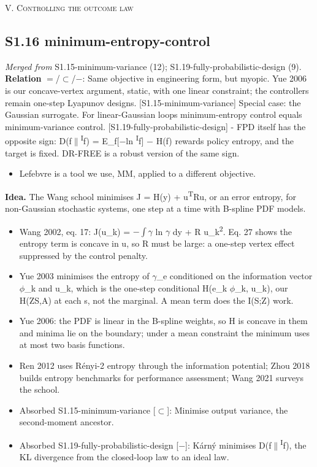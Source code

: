 \documentclass[10pt]{article}
\begin{document}
\medskip\textsc{V. Controlling the outcome law}

\subsection{S1.16 minimum-entropy-control}\label{node:S1-S1-16-minimum-entropy-control}
\textit{Merged from} S1.15-minimum-variance (12); S1.19-fully-probabilistic-design (9). \textbf{Relation} $=$/$\subset$/$-$: Same objective in engineering form, but myopic. Yue 2006 is our concave-vertex argument, static, with one linear constraint; the controllers remain one-step Lyapunov designs. [S1.15-minimum-variance] Special case: the Gaussian surrogate. For linear-Gaussian loops minimum-entropy control equals minimum-variance control. [S1.19-fully-probabilistic-design] - FPD itself has the opposite sign: D(f\ensuremath{\|}\textsuperscript{I}f) = E\_f[\ensuremath{-}ln \textsuperscript{I}f] \ensuremath{-} H(f) rewards policy entropy, and the target is fixed. DR-FREE is a robust version of the same sign.
\begin{itemize}[nosep,leftmargin=1.2em]
\item Lefebvre is a tool we use, MM, applied to a different objective.
\end{itemize}


\textbf{Idea.} The Wang school minimises J = H(y) + u\textsuperscript{T}Ru, or an error entropy, for non-Gaussian stochastic systems, one step at a time with B-spline PDF models.
\begin{itemize}[nosep,leftmargin=1.2em]
\item Wang 2002, eq. 17: J(u\_k) = \ensuremath{-}\ensuremath{\int}\ensuremath{\gamma} ln \ensuremath{\gamma} dy + R u\_k\textsuperscript{2}. Eq. 27 shows the entropy term is concave in u, so R must be large: a one-step vertex effect suppressed by the control penalty.
\item Yue 2003 minimises the entropy of \ensuremath{\gamma}\_e conditioned on the information vector \ensuremath{\phi}\_k and u\_k, which is the one-step conditional H(e\_k \textbar{} \ensuremath{\phi}\_k, u\_k), our H(Z\textbar{}S,A) at each s, not the marginal. A mean term does the I(S;Z) work.
\item Yue 2006: the PDF is linear in the B-spline weights, so H is concave in them and minima lie on the boundary; under a mean constraint the minimum uses at most two basis functions.
\item Ren 2012 uses R\'enyi-2 entropy through the information potential; Zhou 2018 builds entropy benchmarks for performance assessment; Wang 2021 surveys the school.
\item Absorbed S1.15-minimum-variance [\ensuremath{\subset}]: Minimise output variance, the second-moment ancestor.
\item Absorbed S1.19-fully-probabilistic-design [\ensuremath{-}]: K\'arn\'y minimises D(f\ensuremath{\|}\textsuperscript{I}f), the KL divergence from the closed-loop law to an ideal law.
\end{itemize}
\end{document}
